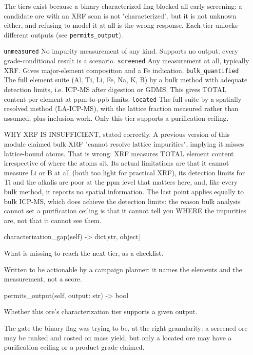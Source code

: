\documentclass[10pt,a4paper,twoside]{report}
\begin{document}
The tiers exist because a binary characterized flag blocked all early screening: a candidate ore with an XRF scan is not "characterized", but it is not unknown either, and refusing to model it at all is the wrong response. Each tier unlocks different outputs (see \texttt{permits\_output}).

\texttt{unmeasured} No impurity measurement of any kind. Supports no output; every grade-conditional result is a scenario. \texttt{screened} Any measurement at all, typically XRF. Gives major-element composition and a Fe indication. \texttt{bulk\_quantified} The full element suite (Al, Ti, Li, Fe, Na, K, B) by a bulk method with adequate detection limits, i.e. ICP-MS after digestion or GDMS. This gives TOTAL content per element at ppm-to-ppb limits. \texttt{located} The full suite by a spatially resolved method (LA-ICP-MS), with the lattice fraction measured rather than assumed, plus inclusion work. Only this tier supports a purification ceiling.

WHY XRF IS INSUFFICIENT, stated correctly. A previous version of this module claimed bulk XRF "cannot resolve lattice impurities", implying it misses lattice-bound atoms. That is wrong: XRF measures TOTAL element content irrespective of where the atoms sit. Its actual limitations are that it cannot measure Li or B at all (both too light for practical XRF), its detection limits for Ti and the alkalis are poor at the ppm level that matters here, and, like every bulk method, it reports no spatial information. The last point applies equally to bulk ICP-MS, which does achieve the detection limits: the reason bulk analysis cannot set a purification ceiling is that it cannot tell you WHERE the impurities are, not that it cannot see them.

\begin{verbatimsmall}
characterization_gap(self) -> dict[str, object]
\end{verbatimsmall}

What is missing to reach the next tier, as a checklist.

Written to be actionable by a campaign planner: it names the elements and the measurement, not a score.

\begin{verbatimsmall}
permits_output(self, output: str) -> bool
\end{verbatimsmall}

Whether this ore's characterization tier supports a given output.

The gate the binary flag was trying to be, at the right granularity: a screened ore may be ranked and costed on mass yield, but only a located ore may have a purification ceiling or a product grade claimed.
\end{document}
